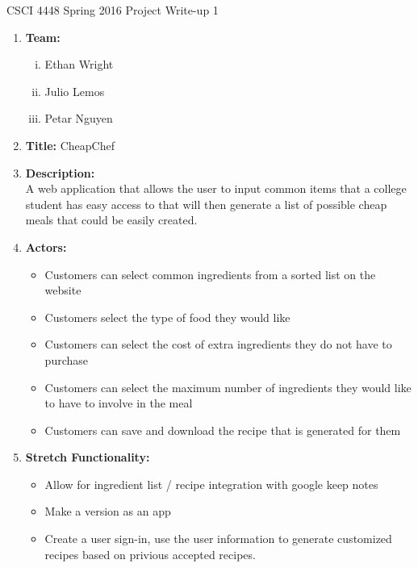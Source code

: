 \documentclass[12pt]{article}
\begin{document}
CSCI 4448 Spring 2016 \hfill Project Write-up 1\\

\hrulefill
\begin{enumerate}
\item\textbf{Team: }
\begin{enumerate}[i.]
\item Ethan Wright
\item Julio Lemos
\item Petar Nguyen
\end{enumerate}
\hrulefill
\item\textbf{Title:} 
CheapChef  \\

\hrulefill
\item\textbf{Description: } \\
A web application that allows the user to input common items that a college student has easy
access to that will then generate a list of possible cheap meals that could be easily created. \\
\hrulefill
\item\textbf{Actors: } \\
\begin{itemize}
\item Customers can select common ingredients from a sorted list on the website
\item Customers select the type of food they would like
\item Customers can select the cost of extra ingredients they do not have to purchase
\item Customers can select the maximum number of ingredients they would like to have to involve in the meal
\item Customers can save and download the recipe that is generated for them
\end{itemize}
\hrulefill
\newpage
\item\textbf{Stretch Functionality: } \\
\begin{itemize}
\item Allow for ingredient list / recipe integration with google keep notes
\item Make a version as an app
\item Create a user sign-in, use the user information to generate customized recipes based on privious accepted recipes. 
\end{itemize}


\end{enumerate}
\end{document}

